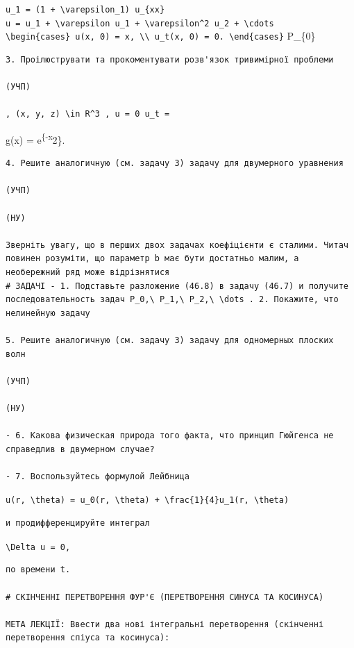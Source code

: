 \documentclass[
  ukrainian,
]{article}
\begin{document}
\texttt{u\_1\ =\ (1\ +\ \textbackslash{}varepsilon\_1)\ u\_\{xx\}}
\texttt{u\ =\ u\_1\ +\ \textbackslash{}varepsilon\ u\_1\ +\ \textbackslash{}varepsilon\^{}2\ u\_2\ +\ \textbackslash{}cdots}
\texttt{\textbackslash{}begin\{cases\}\ u(x,\ 0)\ =\ x,\ \textbackslash{}\textbackslash{}\ u\_t(x,\ 0)\ =\ 0.\ \textbackslash{}end\{cases\}}
P\_\{0\}

\begin{verbatim}
3. Проілюструвати та прокоментувати розв'язок тривимірної проблеми

(УЧП)

, (x, y, z) \in R^3 , u = 0 u_t =
\end{verbatim}

g(x) = e\textsuperscript{\{-x}2\}.

\begin{verbatim}
4. Решите аналогичную (см. задачу 3) задачу для двумерного уравнения

(УЧП)

(НУ)

Зверніть увагу, що в перших двох задачах коефіцієнти є сталими. Читач повинен розуміти, що параметр b має бути достатньо малим, а необережний ряд може відрізнятися
# ЗАДАЧІ - 1. Подставьте разложение (46.8) в задачу (46.7) и получите последовательность задач P_0,\ P_1,\ P_2,\ \dots . 2. Покажите, что нелинейную задачу

5. Решите аналогичную (см. задачу 3) задачу для одномерных плоских волн

(УЧП)

(НУ)

- 6. Какова физическая природа того факта, что принцип Гюйгенса не справедлив в двумерном случае?

- 7. Воспользуйтесь формулой Лейбница
\end{verbatim}

\texttt{u(r,\ \textbackslash{}theta)\ =\ u\_0(r,\ \textbackslash{}theta)\ +\ \textbackslash{}frac\{1\}\{4\}u\_1(r,\ \textbackslash{}theta)}

\begin{verbatim}
и продифференцируйте интеграл
\end{verbatim}

\texttt{\textbackslash{}Delta\ u\ =\ 0,}

\begin{verbatim}
по времени t.

# СКІНЧЕННІ ПЕРЕТВОРЕННЯ ФУР'Є (ПЕРЕТВОРЕННЯ СИНУСА ТА КОСИНУСА)

МЕТА ЛЕКЦІЇ: Ввести два нові інтегральні перетворення (скінченні перетворення спіуса та косинуса):
\end{verbatim}
\end{document}
